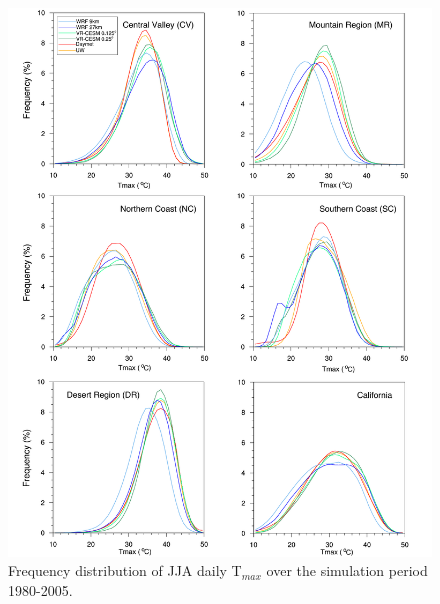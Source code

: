 \begin{figure}
\begin{center}
\includegraphics[width=6in]{PDF_t2max_allzones_JJA.pdf}
\end{center}
\caption{Frequency distribution of JJA daily T$_{max}$ over the simulation period 1980-2005.} \label{fig:Figure 8}
\end{figure}

